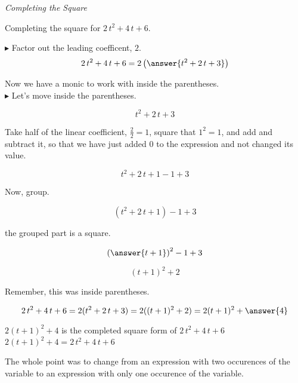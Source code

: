 \documentclass{ximera}
\begin{document}
\begin{example} \textit{Completing the Square}



Completing the square for $2 \, t^2 + 4 \, t + 6$.


\begin{explanation}

$\blacktriangleright$ Factor out the leading coefficent, $2$.\\

\[     2 \, t^2 + 4 \, t + 6 = 2 \left( \answer{t^2 + 2 \, t + 3} \right)   \] 


Now we have a monic to work with inside the parentheses. \\


$\blacktriangleright$ Let's move inside the parentheses.

\[ t^2 + 2 \, t + 3 \]

Take half of the linear coefficient, $\frac{2}{2} = 1$, square that $1^2 = 1$, and add and subtract it, so that we have just added $0$ to the expression and not changed its value.


\[ t^2 + 2 \, t + 1 - 1 +3 \]


Now, group.

\[ (t^2 + 2 \, t + 1) - 1 + 3 \]

the grouped part is a square.

\[ \left( \answer{t+1} \right)^2 - 1 + 3 \]

\[ (t+1)^2 + 2 \]

Remember, this was inside parentheses.

\[     2 \, t^2 + 4 \, t + 6 = 2 (t^2 + 2 \, t + 3)  = 2 ((t+1)^2 + 2) =  2 (t+1)^2 + \answer{4}\] 


$2 (t+1)^2 + 4$ is the completed square form of $2 \, t^2 + 4 \, t + 6$ \\


$2 (t+1)^2 + 4 = 2 \, t^2 + 4 \, t + 6$

\end{explanation}



\end{example}














The whole point was to change from an expression with two occurences of the variable to an expression with only one occurence of the variable. \\
\end{document}
